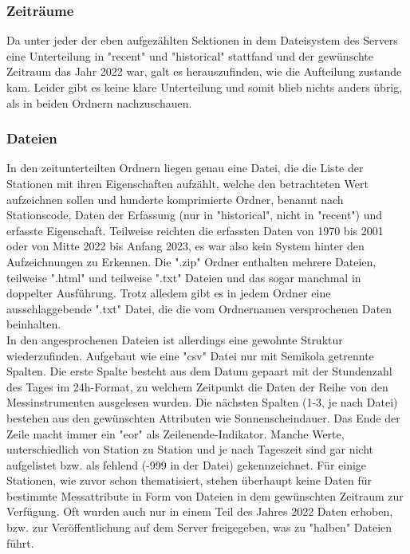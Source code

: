\documentclass[letterpaper]{article} %
\begin{document}
            \subsubsection*{Zeiträume}
                Da unter jeder der eben aufgezählten Sektionen in dem Dateisystem des Servers eine Unterteilung in "recent" und "historical" stattfand und der gewünschte Zeitraum das Jahr 2022 war, galt es herauszufinden, wie die Aufteilung zustande kam. Leider gibt es keine klare Unterteilung und somit blieb nichts anders übrig, als in beiden Ordnern nachzuschauen.
            \subsubsection*{Dateien}
                In den zeitunterteilten Ordnern liegen genau eine Datei, die die Liste der Stationen mit ihren Eigenschaften aufzählt, welche den betrachteten Wert aufzeichnen sollen und hunderte komprimierte Ordner, benannt nach Stationscode, Daten der Erfassung (nur in "historical", nicht in "recent") und erfasste Eigenschaft. Teilweise reichten die erfassten Daten von 1970 bis 2001 oder von Mitte 2022 bis Anfang 2023, es war also kein System hinter den Aufzeichnungen zu Erkennen.
                Die ".zip" Ordner enthalten mehrere Dateien, teilweise ".html" und teilweise ".txt" Dateien und das sogar manchmal in doppelter Ausführung. Trotz alledem gibt es in jedem Ordner eine ausschlaggebende ".txt" Datei, die die vom Ordnernamen versprochenen Daten beinhalten.
        \\
        
        In den angesprochenen Dateien ist allerdings eine gewohnte Struktur wiederzufinden. Aufgebaut wie eine "csv" Datei nur mit Semikola getrennte Spalten. Die erste Spalte besteht aus dem Datum gepaart mit der Stundenzahl des Tages im 24h-Format, zu welchem Zeitpunkt die Daten der Reihe von den Messinstrumenten ausgelesen wurden. Die nächsten Spalten (1-3, je nach Datei) bestehen aus den gewünschten Attributen wie Sonnenscheindauer. Das Ende der Zeile macht immer ein "eor" als Zeilenende-Indikator.
        Manche Werte, unterschiedlich von Station zu Station und je nach Tageszeit sind gar nicht aufgelistet bzw. als fehlend (-999 in der Datei) gekennzeichnet. Für einige Stationen, wie zuvor schon thematisiert, stehen überhaupt keine Daten für bestimmte Messattribute in Form von Dateien in dem gewünschten Zeitraum zur Verfügung.
        Oft wurden auch nur in einem Teil des Jahres 2022 Daten erhoben, bzw. zur Veröffentlichung auf dem Server freigegeben, was zu "halben" Dateien führt.
\end{document}
